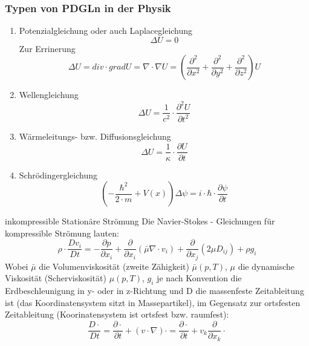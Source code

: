 \documentclass[
	11pt, %
]{beamer}
\begin{document}
\begin{frame}
	\frametitle{Typen von PDGLn in der Physik}
	\begin{enumerate}	
		\item Potenzialgleichung oder auch Laplacegleichung
			\begin{equation}
				\Delta U = 0
			\end{equation}
			Zur Errinerung
			\begin{equation}
				\Delta U = div \cdot grad U = \nabla \cdot \nabla U = \left( \frac{\partial^2}{\partial x^2}+\frac{\partial^2}{\partial y^2}+\frac{\partial^2}{\partial z^2}\right)U
			\end{equation}
		\item Wellengleichung
			\begin{equation}
				\Delta U = \frac{1}{c^2}\cdot \frac{\partial^2 U}{\partial t^2}
			\end{equation}
		\item W\"armeleitungs- bzw. Diffusionsgleichung
			\begin{equation}
				\Delta U = \frac{1}{\kappa}\cdot \frac{\partial U}{\partial t}
			\end{equation}
		\item Schr\"odingergleichung
			\begin{equation}
				\left(- \frac{\hbar^2}{2\cdot m} + V(x)\right) \Delta \psi = i\cdot \hbar \cdot \frac{\partial \psi}{\partial t}
			\end{equation}
	\end{enumerate}	
\end{frame}
\begin{frame}
	\begin{exampleblock}{inkompressible Station\"are Str\"omung}
		Die Navier-Stokes - Gleichungen f\"ur kompressible Str\"omung lauten:	
			\begin{equation}
				\rho\cdot \frac{Dv_i}{Dt} = -\frac{\partial p}{\partial x_i} + \frac{\partial}{\partial x_i}\left(\bar{\mu} \nabla \cdot v_i \right) + \frac{\partial}{\partial x_j}\left(2\mu D_{ij}\right)+\rho g_i
			\end{equation}
			Wobei $\bar{\mu}$ die Volumenviskosit\"at (zweite Z\"ahigkeit) $\bar{\mu}(p,T)$, $\mu$ die dynamische Viskosit\"at (Scherviskosit\"at) $\mu(p,T)$, $g_i$ je nach Konvention die Erdbeschleunigung in y- oder in z-Richtung und D die massenfeste Zeitableitung ist (das Koordinatensystem sitzt in Massepartikel), im Gegensatz zur ortsfesten Zeitableitung (Koorinatensystem ist ortsfest bzw. raumfest):
			\begin{equation}
				\frac{D\cdot}{Dt}=\frac{\partial\cdot}{\partial t} + \left(v \cdot \nabla\right)\cdot = \frac{\partial\cdot}{\partial t} + v_k \frac{\partial}{\partial x_k}\cdot
			\end{equation}
	\end{exampleblock}
			\end{frame}
\end{document}
